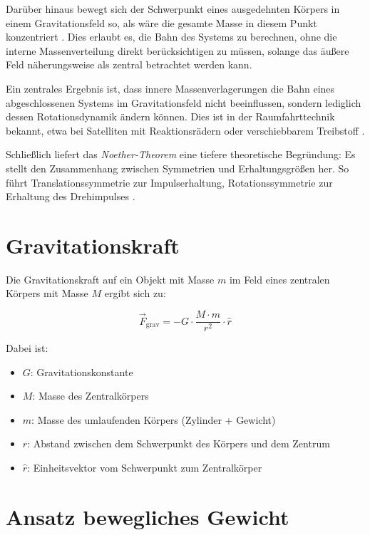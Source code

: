 \documentclass[conference]{IEEEtran}
\begin{document}
Darüber hinaus bewegt sich der Schwerpunkt eines ausgedehnten Körpers in einem Gravitationsfeld so, als wäre die gesamte Masse in diesem Punkt konzentriert \cite{taylor, landau}. Dies erlaubt es, die Bahn des Systems zu berechnen, ohne die interne Massenverteilung direkt berücksichtigen zu müssen, solange das äußere Feld näherungsweise als zentral betrachtet werden kann.

Ein zentrales Ergebnis ist, dass innere Massenverlagerungen die Bahn eines abgeschlossenen Systems im Gravitationsfeld nicht beeinflussen, sondern lediglich dessen Rotationsdynamik ändern können. Dies ist in der Raumfahrttechnik bekannt, etwa bei Satelliten mit Reaktionsrädern oder verschiebbarem Treibstoff \cite{marion}.

Schließlich liefert das \textit{Noether-Theorem} eine tiefere theoretische Begründung: Es stellt den Zusammenhang zwischen Symmetrien und Erhaltungsgrößen her. So führt Translationssymmetrie zur Impulserhaltung, Rotationssymmetrie zur Erhaltung des Drehimpulses \cite{noether}.




\section{Gravitationskraft}

Die Gravitationskraft auf ein Objekt mit Masse \( m \) im Feld eines zentralen Körpers mit Masse \( M \) ergibt sich zu:

\[
\vec{F}_\text{grav} = -G \cdot \frac{M \cdot m}{r^2} \cdot \hat{r}
\]

Dabei ist:
\begin{itemize}
  \item \( G \): Gravitationskonstante
  \item \( M \): Masse des Zentralkörpers
  \item \( m \): Masse des umlaufenden Körpers (Zylinder + Gewicht)
  \item \( r \): Abstand zwischen dem Schwerpunkt des Körpers und dem Zentrum
  \item \( \hat{r} \): Einheitsvektor vom Schwerpunkt zum Zentralkörper
\end{itemize}


\section{Ansatz bewegliches Gewicht}
\end{document}
